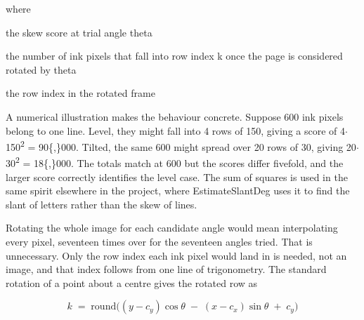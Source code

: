 \noindent where
\begin{description}[leftmargin=2.4em,style=nextline,font=\normalfont\ttfamily]\setlength\itemsep{1pt}
  \item[{$S(\theta)$}] \normalfont the skew score at trial angle theta
  \item[{$\mathrm{prof}_{\theta}[k]$}] \normalfont the number of ink pixels that fall into row index k once the page is considered rotated by theta
  \item[{$k$}] \normalfont the row index in the rotated frame
\end{description}
A numerical illustration makes the behaviour concrete. Suppose 600 ink pixels belong to one line. Level, they might fall into 4 rows of 150, giving a score of 4$\cdot$150\textsuperscript{2} = 90\{,\}000. Tilted, the same 600 might spread over 20 rows of 30, giving 20$\cdot$30\textsuperscript{2} = 18\{,\}000. The totals match at 600 but the scores differ fivefold, and the larger score correctly identifies the level case. The sum of squares is used in the same spirit elsewhere in the project, where EstimateSlantDeg uses it to find the slant of letters rather than the skew of lines.


Rotating the whole image for each candidate angle would mean interpolating every pixel, seventeen times over for the seventeen angles tried. That is unnecessary. Only the row index each ink pixel would land in is needed, not an image, and that index follows from one line of trigonometry. The standard rotation of a point about a centre gives the rotated row as


\begin{equation}
k \;=\; \mathrm{round}\Big( (y - c_y)\cos\theta \;-\; (x - c_x)\sin\theta \;+\; c_y \Big)
\end{equation}

